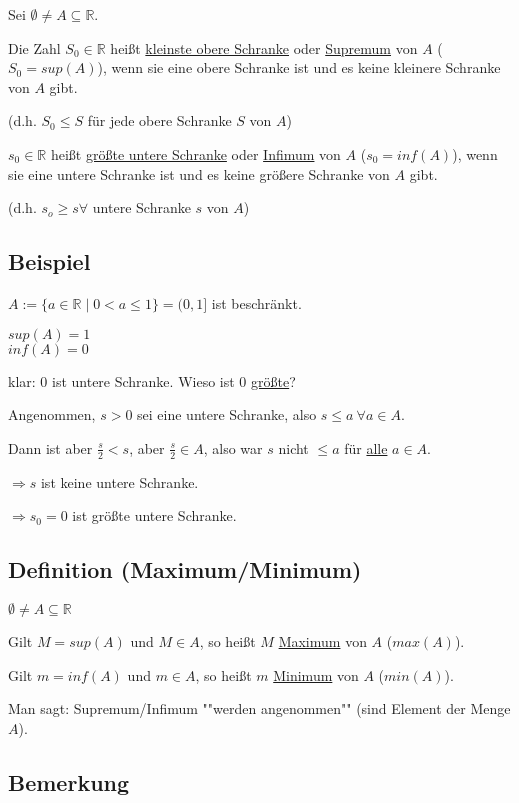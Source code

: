 \documentclass[a4paper, 12pt, twoside] {article}
\begin{document}
Sei $\emptyset \neq A \subseteq \mathbb{R}$.

Die Zahl $S_0 \in \mathbb{R}$ heißt \uline{kleinste obere Schranke} oder \uline{Supremum} von $A$ ($S_0 = sup(A)$), wenn sie eine obere Schranke ist und es keine kleinere Schranke von $A$ gibt.

(d.h. $S_0 \leq S$ für jede obere Schranke $S$ von $A$)

$s_0 \in \mathbb{R}$ heißt \uline{größte untere Schranke} oder \uline{Infimum} von $A$ ($s_0 = inf(A)$), wenn sie eine untere Schranke ist und es keine größere Schranke von $A$ gibt.

(d.h. $s_o \geq s \forall$ untere Schranke $s$ von $A$)

\subsection{Beispiel} %

$A := \{a \in \mathbb{R} \mid 0 < a \leq 1\} = (0,1]$ ist beschränkt.

$sup(A) = 1$ \\
$inf(A) = 0$

klar: $0$ ist untere Schranke. Wieso ist $0$ \underline{größte}?

Angenommen, $s > 0$ sei eine untere Schranke, also $s \leq a \ \forall a \in A$.

Dann ist aber $\frac{s}{2} < s$, aber $\frac{s}{2} \in A$, also war $s$ nicht $\leq a$ für \uline{alle} $a \in A$.

$\Rightarrow s$ ist keine untere Schranke.

$\Rightarrow s_0 = 0$ ist größte untere Schranke.

\subsection{Definition (Maximum/Minimum)} %

$\emptyset \neq A \subseteq \mathbb{R}$

Gilt $M = sup(A)$ und $M \in A$, so heißt $M$ \uline{Maximum} von $A$ ($max(A)$).

Gilt $m = inf(A)$ und $m \in A$, so heißt $m$ \uline{Minimum} von $A$ ($min(A)$).

Man sagt: Supremum/Infimum ""werden angenommen"" (sind Element der Menge $A$).

\subsection{Bemerkung} %
\end{document}
